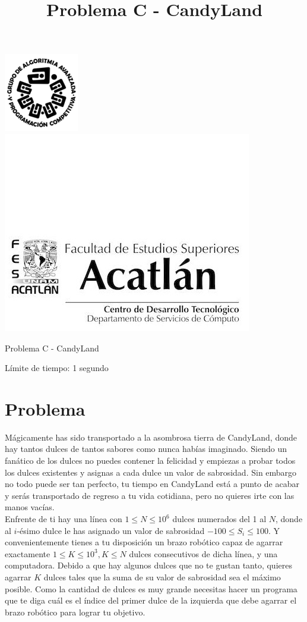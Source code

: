 \documentclass[letter,10pt]{article}
\date{}
\begin{document}
\title{Problema C - CandyLand}

\includegraphics[scale=0.6]{logo} \hspace*{9.00cm}
\includegraphics[scale=0.5]{dsc} 
\bigskip

\begin{center}
	\Large Problema C - CandyLand
\end{center}

\begin{flushright}
Límite de tiempo: 1 segundo
\par\end{flushright}
\bigskip

\section*{Problema}

Mágicamente has sido transportado a la asombrosa tierra de CandyLand, donde hay tantos dulces de tantos sabores como nunca habías imaginado. Siendo un fanático de los dulces no puedes contener la felicidad y empiezas a probar todos los dulces existentes y asignas a cada dulce un valor de sabrosidad. Sin embargo no todo puede ser tan perfecto, tu tiempo en CandyLand está a punto de acabar y serás transportado de regreso a tu vida cotidiana, pero no quieres irte con las manos vacías.
$$$$
Enfrente de ti hay una línea con $1 \leq N \leq 10^6$ dulces numerados del 1 al $N$, donde al $i$-ésimo dulce le has asignado un valor de sabrosidad $-100 \leq S_i \leq 100$. Y convenientemente tienes a tu disposición un brazo robótico capaz de agarrar exactamente $1 \leq K \leq 10^3, K \leq N$ dulces consecutivos de dicha línea, y una computadora. Debido a que hay algunos dulces que no te gustan tanto, quieres agarrar $K$ dulces tales que la suma de su valor de sabrosidad sea el máximo posible. Como la cantidad de dulces es muy grande necesitas hacer un programa que te diga cuál es el índice del primer dulce de la izquierda que debe agarrar el brazo robótico para lograr tu objetivo.
\end{document}
